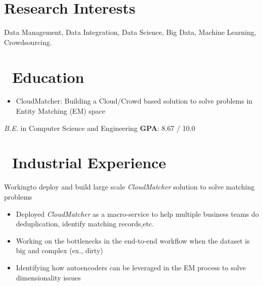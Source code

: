 \documentclass{resume}
\begin{document}



\section{Research Interests}
Data Management, Data Integration, Data Science, Big Data, Machine Learning, Crowdsourcing.

\section{\faGraduationCap\ Education}
\begin{itemize}
\item CloudMatcher: Building a Cloud/Crowd based solution to solve problems in Entity Matching (EM) space 
\end{itemize}
\textit{B.E.} in Computer Science and Engineering \textbf{GPA}: 8.67 / 10.0

\section{\faUsers\ Industrial Experience}
Workingto deploy and build large scale \textit{CloudMatcher} solution to solve matching problems
\begin{itemize}
  \item Deployed \textit{CloudMatcher} as a macro-service to help multiple business teams do deduplication, identify matching records,etc.
  \item Working on the bottlenecks in the end-to-end workflow when the dataset is big and complex (ex., dirty)
  \item Identifying how autoencoders can be leveraged in the EM process to solve dimensionality issues
\end{itemize}
\end{document}

